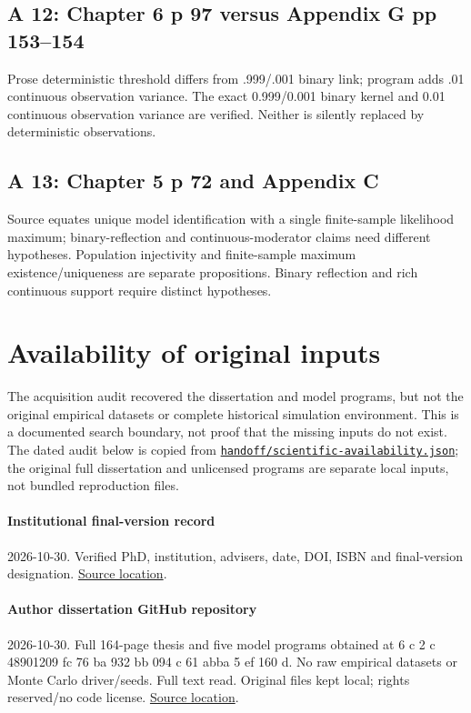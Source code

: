 \documentclass[11pt]{article}
\newcommand{\file}[1]{\href{https://github.com/alectionary/vibe-math/blob/master/formalization/schwabe-psychometric-genetics/#1}{\nolinkurl{#1}}}
\begin{document}
\subsection{A 12: Chapter 6 p 97 versus Appendix G pp 153--154}
Prose deterministic threshold differs from .999/.001 binary link; program adds .01 continuous observation variance. The exact 0.999/0.001 binary kernel and 0.01 continuous observation variance are verified. Neither is silently replaced by deterministic observations.
\subsection{A 13: Chapter 5 p 72 and Appendix C}
Source equates unique model identification with a single finite-sample likelihood maximum; binary-reflection and continuous-moderator claims need different hypotheses. Population injectivity and finite-sample maximum existence/uniqueness are separate propositions. Binary reflection and rich continuous support require distinct hypotheses.
\section{Availability of original inputs}\label{sec:availability}
The acquisition audit recovered the dissertation and model programs, but not the original empirical datasets or complete historical simulation environment. This is a documented search boundary, not proof that the missing inputs do not exist. The dated audit below is copied from \file{handoff/scientific-availability.json}; the original full dissertation and unlicensed programs are separate local inputs, not bundled reproduction files.
\paragraph{Institutional final-version record} 2026-10-30. Verified PhD, institution, advisers, date, DOI, ISBN and final-version designation. \href{https://research.utwente.nl/en/publications/nature-nurture-and-item-response-theory-a-psychometric-approach-t/}{Source location}.
\paragraph{Author dissertation GitHub repository} 2026-10-30. Full 164-page thesis and five model programs obtained at 6 c 2 c 48901209 fc 76 ba 932 bb 094 c 61 abba 5 ef 160 d. No raw empirical datasets or Monte Carlo driver/seeds. Full text read. Original files kept local; rights reserved/no code license. \href{https://github.com/ingaschwabe/Nature-Nurture-and-Item-Response-Theory}{Source location}.
\end{document}
